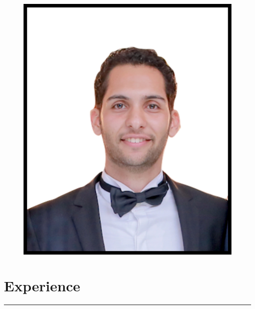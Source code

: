 \documentclass[a4paper,13pt]{article}
\begin{document}
\begin{adjustwidth}{-3cm}{}
\begin{figure}[h]
	\vspace{-3cm} \hspace{13cm} \includegraphics[scale=0.06]{me.jpg}	
	
\end{figure}








\section{Experience}
\rule[0pt]{20cm}{0.5pt}

\begin{tabular}{r|p{17.5cm}}
		

\end{tabular}
\end{adjustwidth}
\end{document}
